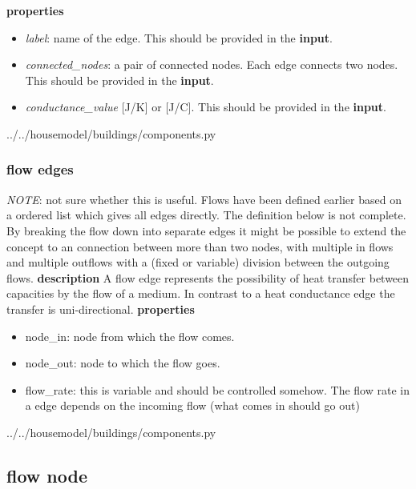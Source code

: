 \textbf{properties}
\begin{itemize}
	\item \emph{label}: name of the edge. This should be provided in the \textbf{input}.
	\item \emph{connected\_nodes}: a pair of connected nodes. Each edge connects two nodes. This should be provided in the \textbf{input}. 
	\item \emph{conductance\_value} [J/K] or [J/\degree C]. This should be provided in the \textbf{input}.
\end{itemize}

 
{../../housemodel/buildings/components.py}

\subsubsection{flow edges}
\emph{NOTE}: not sure whether this is useful. Flows have been defined earlier based on a ordered list which gives all edges directly. The definition below is not complete. By breaking the  flow down into separate edges it might be possible to extend the concept to an connection between more than two nodes, with multiple in flows and multiple outflows with a (fixed or variable) division between the outgoing flows.  
\textbf{description} A flow edge represents the possibility of heat transfer between capacities by the flow of a medium. In contrast to a heat conductance edge the transfer is uni-directional. 
\textbf{properties}
\begin{itemize}	
	\item node\_in: node from which the flow comes. 
	\item node\_out: node to which the flow goes. 	
	\item flow\_rate: this is variable and should be controlled somehow. The flow rate in a edge depends on the incoming flow (what comes in should go out) 
\end{itemize}

 
{../../housemodel/buildings/components.py}

\subsection{flow node}


